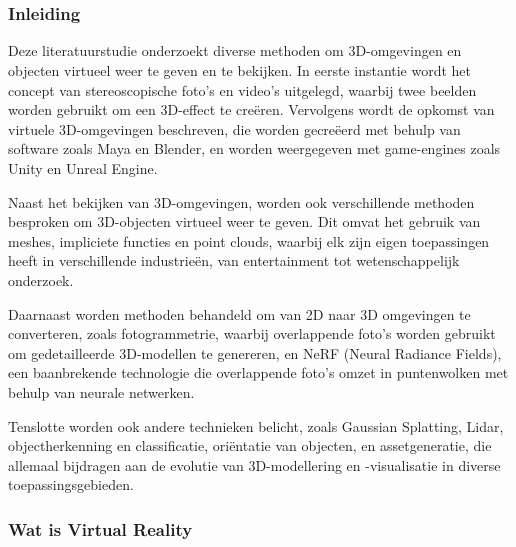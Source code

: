 \chapter{}%
\label{ch:stand-van-zaken}


\subsection{Inleiding}

Deze literatuurstudie onderzoekt diverse methoden om 3D-omgevingen en objecten virtueel weer te geven en te bekijken. In eerste instantie wordt het concept van stereoscopische foto's en video's uitgelegd, waarbij twee beelden worden gebruikt om een 3D-effect te creëren. Vervolgens wordt de opkomst van virtuele 3D-omgevingen beschreven, die worden gecreëerd met behulp van software zoals Maya en Blender, en worden weergegeven met game-engines zoals Unity en Unreal Engine.

Naast het bekijken van 3D-omgevingen, worden ook verschillende methoden besproken om 3D-objecten virtueel weer te geven. Dit omvat het gebruik van meshes, impliciete functies en point clouds, waarbij elk zijn eigen toepassingen heeft in verschillende industrieën, van entertainment tot wetenschappelijk onderzoek.

Daarnaast worden methoden behandeld om van 2D naar 3D omgevingen te converteren, zoals fotogrammetrie, waarbij overlappende foto's worden gebruikt om gedetailleerde 3D-modellen te genereren, en NeRF (Neural Radiance Fields), een baanbrekende technologie die overlappende foto's omzet in puntenwolken met behulp van neurale netwerken.

Tenslotte worden ook andere technieken belicht, zoals Gaussian Splatting, Lidar, objectherkenning en classificatie, oriëntatie van objecten, en assetgeneratie, die allemaal bijdragen aan de evolutie van 3D-modellering en -visualisatie in diverse toepassingsgebieden.

\subsection{Wat is Virtual Reality}

